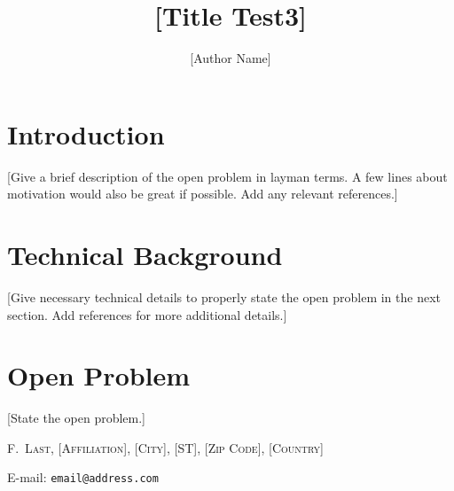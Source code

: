 \documentclass[11pt]{article}
\numberwithin{equation}{section}
\theoremstyle{plain}
\theoremstyle{plain}
\theoremstyle{definition}
\begin{document}
\title{[Title Test3]}

\author{[Author Name]}


\date{}

\maketitle


\section{Introduction}

[Give a brief description of the open problem in layman terms. A few lines about motivation would also be great if possible. Add any relevant references.]

\section{Technical Background}

[Give necessary technical details to properly state the open problem in the next section. Add references for more additional details.]

\section{Open Problem}

[State the open problem.]












\textsc{F.~Last, [Affiliation], [City], [ST],  [Zip Code], [Country]}

E-mail: \texttt{email@address.com}

    
\end{document}
